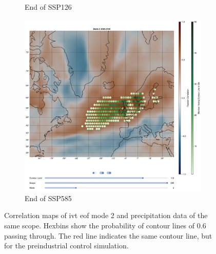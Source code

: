 \begin{figure}[!htb]
\begin{subfigure}[b]{0.49\textwidth}
    \caption{End of SSP126} 
    \label{fig:ivt eof pr cor ssp126 mode2}
  \end{subfigure}
  \begin{subfigure}[b]{0.49\textwidth}
    \includegraphics[width=\textwidth]{figures/ivt_pr_cor_mode2_ssp585_hexbin.png}
    \caption{End of SSP585}
    \label{fig:ivt eof pr cor ssp585 mode2}
  \end{subfigure}
  \caption[Correlation Maps of IVT EOF Mode 2 and PR Data]{Correlation maps of \ac{ivt} \ac{eof} mode 2 and precipitation data of the same scope. Hexbins show the probability of contour lines of $0.6$ passing through. The red line indicates the same contour line, but for the preindustrial control simulation.}
  \label{fig:ivt eof pr cor mode2}
\end{figure}


